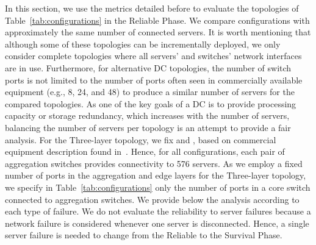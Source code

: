 In this section, we use the metrics detailed before to evaluate the topologies of Table~\ref{tab:configurations} in the Reliable Phase. We compare configurations with approximately the same number of connected servers. It is worth mentioning that although some of these topologies can be incrementally deployed, we only consider complete topologies where all servers' and switches' network interfaces are in use. Furthermore, for alternative DC topologies, the number of switch ports is not limited to the number of ports often seen in commercially available equipment (e.g., 8, 24, and 48) to produce a similar number of servers for the compared topologies. As one of the key goals of a DC is to provide processing capacity or storage redundancy, which increases with the number of servers, balancing the number of servers per topology is an attempt to provide a fair analysis. 
For the Three-layer topology, we fix  and , based on commercial equipment description found in~\cite{scotland}. Hence, for all configurations, each pair of aggregation switches provides connectivity to 576 servers.
As we employ a fixed number of ports in the aggregation and edge layers for the Three-layer topology, we specify in Table~\ref{tab:configurations} only the number of ports in a core switch connected to aggregation switches. 
We provide below the analysis according to each type of failure. We do not evaluate the reliability to server failures because a network failure is considered whenever one server is disconnected. Hence, a single server failure is needed to change from the Reliable to the Survival Phase.
